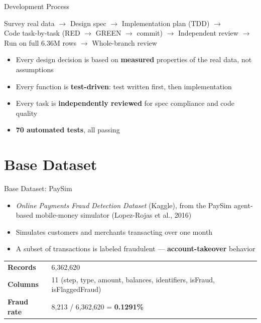 \documentclass[aspectratio=169]{beamer}
\begin{document}
\begin{frame}{Development Process}
\begin{center}
\small
Survey real data \(\rightarrow\) Design spec \(\rightarrow\) Implementation plan (TDD) \(\rightarrow\)\\
Code task-by-task (RED \(\rightarrow\) GREEN \(\rightarrow\) commit) \(\rightarrow\) Independent review \(\rightarrow\)\\
Run on full 6.36M rows \(\rightarrow\) Whole-branch review
\end{center}
\vspace{0.3cm}
\begin{itemize}
    \item Every design decision is based on \textbf{measured} properties of the real data, not assumptions
    \item Every function is \textbf{test-driven}: test written first, then implementation
    \item Every task is \textbf{independently reviewed} for spec compliance and code quality
    \item \textbf{70 automated tests}, all passing
\end{itemize}
\end{frame}

\section{Base Dataset}

\begin{frame}{Base Dataset: PaySim}
\begin{itemize}
    \item \emph{Online Payments Fraud Detection Dataset} (Kaggle), from the PaySim agent-based mobile-money simulator (Lopez-Rojas et al., 2016)
    \item Simulates customers and merchants transacting over one month
    \item A subset of transactions is labeled fraudulent --- \textbf{account-takeover} behavior
\end{itemize}

\vspace{0.3cm}
\begin{table}
\centering\footnotesize
\begin{tabular}{ll}
\toprule
\textbf{Records} & 6,362,620 \\
\textbf{Columns} & 11 (step, type, amount, balances, identifiers, isFraud, isFlaggedFraud) \\
\textbf{Fraud rate} & 8,213 / 6,362,620 = \textbf{0.1291\%} \\
\bottomrule
\end{tabular}
\end{table}
\end{frame}
\end{document}
